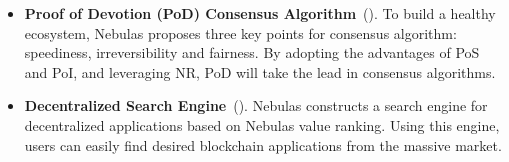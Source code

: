 {\begin{itemize}
  \item \textbf{Proof of Devotion (PoD) Consensus Algorithm}~(). To build a healthy ecosystem, Nebulas proposes three key points for consensus algorithm: speediness, irreversibility and fairness. By adopting the advantages of PoS and PoI, and leveraging NR, PoD will take the lead in consensus algorithms.

  \item \textbf{Decentralized Search Engine}~(). Nebulas constructs a search engine for decentralized applications based on Nebulas value ranking. Using this engine, users can easily find desired blockchain applications from the massive market.

\end{itemize}
}
